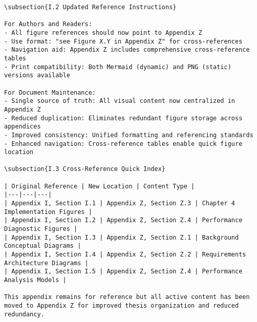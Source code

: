 \begin{verbatim}
\subsection{I.2 Updated Reference Instructions}

For Authors and Readers:
- All figure references should now point to Appendix Z
- Use format: "see Figure X.Y in Appendix Z" for cross-references
- Navigation aid: Appendix Z includes comprehensive cross-reference tables
- Print compatibility: Both Mermaid (dynamic) and PNG (static) versions available

For Document Maintenance:
- Single source of truth: All visual content now centralized in Appendix Z
- Reduced duplication: Eliminates redundant figure storage across appendices
- Improved consistency: Unified formatting and referencing standards
- Enhanced navigation: Cross-reference tables enable quick figure location

\subsection{I.3 Cross-Reference Quick Index}

| Original Reference | New Location | Content Type |
|---|---|---|
| Appendix I, Section I.1 | Appendix Z, Section Z.3 | Chapter 4 Implementation Figures |
| Appendix I, Section I.2 | Appendix Z, Section Z.4 | Performance Diagnostic Figures |
| Appendix I, Section I.3 | Appendix Z, Section Z.1 | Background Conceptual Diagrams |
| Appendix I, Section I.4 | Appendix Z, Section Z.2 | Requirements Architecture Diagrams |
| Appendix I, Section I.5 | Appendix Z, Section Z.4 | Performance Analysis Models |

This appendix remains for reference but all active content has been moved to Appendix Z for improved thesis organization and reduced redundancy.
\end{verbatim}
